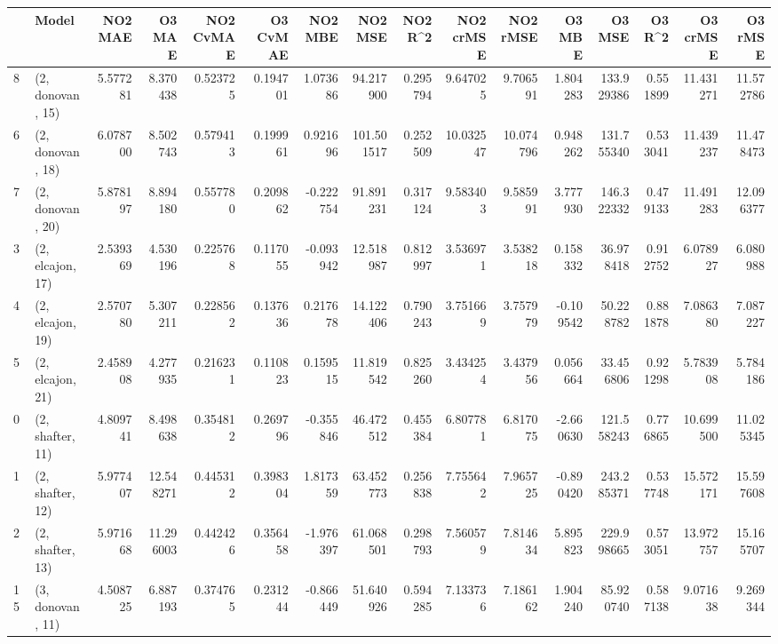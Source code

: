 \begin{tabular}{llrrrrrrrrrrrrrr}
\toprule
{} &             Model &   NO2 MAE &     O3 MAE &  NO2 CvMAE &  O3 CvMAE &   NO2 MBE &     NO2 MSE &   NO2 R\textasciicircum2 &  NO2 crMSE &   NO2 rMSE &     O3 MBE &      O3 MSE &    O3 R\textasciicircum2 &   O3 crMSE &    O3 rMSE \\
\midrule
8  &  (2, donovan, 15) &  5.577281 &   8.370438 &   0.523725 &  0.194701 &  1.073686 &   94.217900 &  0.295794 &   9.647025 &   9.706591 &   1.804283 &  133.929386 &  0.551899 &  11.431271 &  11.572786 \\
6  &  (2, donovan, 18) &  6.078700 &   8.502743 &   0.579413 &  0.199961 &  0.921696 &  101.501517 &  0.252509 &  10.032547 &  10.074796 &   0.948262 &  131.755340 &  0.533041 &  11.439237 &  11.478473 \\
7  &  (2, donovan, 20) &  5.878197 &   8.894180 &   0.557780 &  0.209862 & -0.222754 &   91.891231 &  0.317124 &   9.583403 &   9.585991 &   3.777930 &  146.322332 &  0.479133 &  11.491283 &  12.096377 \\
3  &  (2, elcajon, 17) &  2.539369 &   4.530196 &   0.225768 &  0.117055 & -0.093942 &   12.518987 &  0.812997 &   3.536971 &   3.538218 &   0.158332 &   36.978418 &  0.912752 &   6.078927 &   6.080988 \\
4  &  (2, elcajon, 19) &  2.570780 &   5.307211 &   0.228562 &  0.137636 &  0.217678 &   14.122406 &  0.790243 &   3.751669 &   3.757979 &  -0.109542 &   50.228782 &  0.881878 &   7.086380 &   7.087227 \\
5  &  (2, elcajon, 21) &  2.458908 &   4.277935 &   0.216231 &  0.110823 &  0.159515 &   11.819542 &  0.825260 &   3.434254 &   3.437956 &   0.056664 &   33.456806 &  0.921298 &   5.783908 &   5.784186 \\
0  &  (2, shafter, 11) &  4.809741 &   8.498638 &   0.354812 &  0.269796 & -0.355846 &   46.472512 &  0.455384 &   6.807781 &   6.817075 &  -2.660630 &  121.558243 &  0.776865 &  10.699500 &  11.025345 \\
1  &  (2, shafter, 12) &  5.977407 &  12.548271 &   0.445312 &  0.398304 &  1.817359 &   63.452773 &  0.256838 &   7.755642 &   7.965725 &  -0.890420 &  243.285371 &  0.537748 &  15.572171 &  15.597608 \\
2  &  (2, shafter, 13) &  5.971668 &  11.296003 &   0.442426 &  0.356458 & -1.976397 &   61.068501 &  0.298793 &   7.560579 &   7.814634 &   5.895823 &  229.998665 &  0.573051 &  13.972757 &  15.165707 \\
15 &  (3, donovan, 11) &  4.508725 &   6.887193 &   0.374765 &  0.231244 & -0.866449 &   51.640926 &  0.594285 &   7.133736 &   7.186162 &   1.904240 &   85.920740 &  0.587138 &   9.071638 &   9.269344 \\

\end{tabular}
